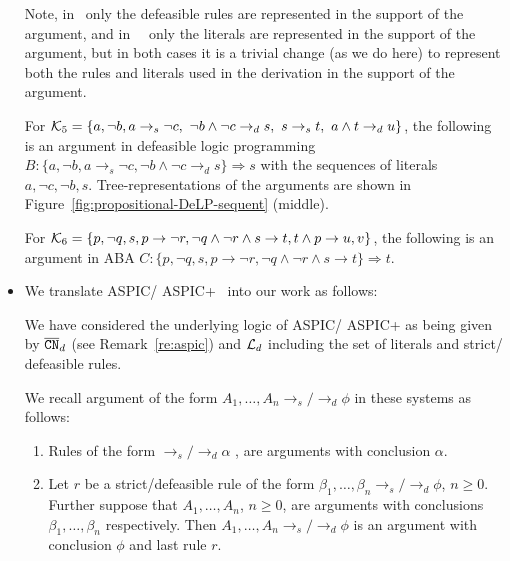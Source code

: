 \begin{itemize}
Note, in~\cite{Alejandro2014} only the defeasible rules are represented in the support of the argument, and in~~\cite{Dung2009,DimopoulosD0R0W24,Rapberger2024,Lehtonen2024} only the literals are represented in the support of the argument, but in both cases it is a trivial change (as we do here) to represent both the rules and literals used in the derivation in the support of the argument.

\begin{example}
For $\mK_5 = \{a, \neg b, a \rightarrow_s \neg c ,\ \neg b \wedge \neg c \rightarrow_{d} s,\ s \rightarrow_{s} t,\ a \wedge t \rightarrow_{d} u \}$, the following is an argument in defeasible logic programming $B : \{a, \neg b, a \rightarrow_s \neg c , \neg b \wedge \neg c \rightarrow_{d} s \} \Rightarrow s$ with the sequences of literals $a, \neg c , \neg b, s$. Tree-representations of the arguments are shown in Figure~\ref{fig:propositional-DeLP-sequent} (middle).

For $\mathcal{K}_6 = \{p, \neg q, s, p \rightarrow \neg r, \neg q \wedge \neg r \wedge s \rightarrow t, t \wedge p \rightarrow u, v \}$, the following is an argument in ABA $C : \{p, \neg q, s, p \rightarrow \neg r, \neg q \wedge \neg r \wedge s \rightarrow t \} \Rightarrow t$.

\end{example}

\item We translate ASPIC/ ASPIC+~\cite{Prakken2002,ModgilP14} into our work as follows:

We have considered the underlying logic of ASPIC/ ASPIC+ as being given by $\overline{\texttt{\textup{CN}}}_{d}$ (see Remark~\ref{re:aspic}) and $\mathcal{L}_d$ including the set of literals and strict/ defeasible rules.

We recall argument of the form $A_1, \ldots, A_n \rightarrow_s / \rightarrow_d \phi$ 
in these systems as follows:
\begin{enumerate}
    \item Rules of the form $\rightarrow_s / \rightarrow_d \alpha$ , are arguments with conclusion $\alpha$.

    \item  Let $r$ be a strict/defeasible rule of the form $\beta_1, \ldots, \beta_n \rightarrow_s / \rightarrow_d \phi$, $n \geq 0$.
    Further suppose that $A_1, \ldots, A_n$, $n \geq 0$, are arguments with conclusions $\beta_1, \ldots, \beta_n$ respectively.
    Then $A_1, \ldots, A_n \rightarrow_s / \rightarrow_d \phi$ is an argument with conclusion $\phi$ and last rule $r$.
    

\end{enumerate}
\end{itemize}
